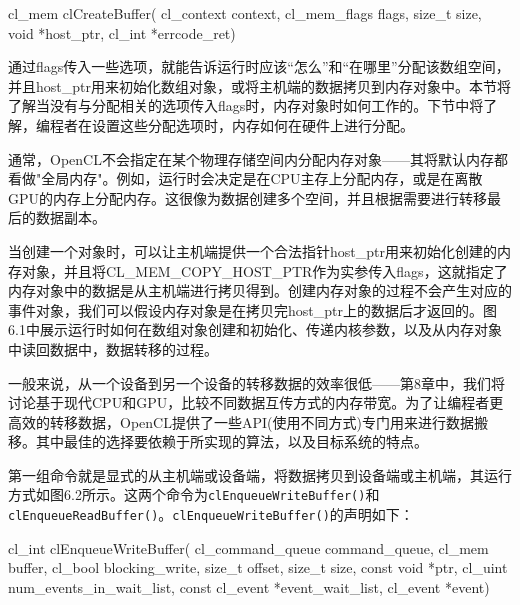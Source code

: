 \begin{codebox}[cpp]
cl_mem
clCreateBuffer(
  cl_context context,
  cl_mem_flags flags,
  size_t size,
  void *host_ptr,
  cl_int *errcode_ret)
\end{codebox}

通过flags传入一些选项，就能告诉运行时应该“怎么”和“在哪里”分配该数组空间，并且host\_\allowbreak{}ptr用来初始化数组对象，或将主机端的数据拷贝到内存对象中。本节将了解当没有与分配相关的选项传入flags时，内存对象时如何工作的。下节中将了解，编程者在设置这些分配选项时，内存如何在硬件上进行分配。

通常，OpenCL不会指定在某个物理存储空间内分配内存对象——其将默认内存都看做"全局内存"。例如，运行时会决定是在CPU主存上分配内存，或是在离散GPU的内存上分配内存。这很像为数据创建多个空间，并且根据需要进行转移最后的数据副本。

当创建一个对象时，可以让主机端提供一个合法指针host\_\allowbreak{}ptr用来初始化创建的内存对象，并且将CL\_\allowbreak{}MEM\_\allowbreak{}COPY\_\allowbreak{}HOST\_\allowbreak{}PTR作为实参传入flags，这就指定了内存对象中的数据是从主机端进行拷贝得到。创建内存对象的过程不会产生对应的事件对象，我们可以假设内存对象是在拷贝完host\_\allowbreak{}ptr上的数据后才返回的。图6.1中展示运行时如何在数组对象创建和初始化、传递内核参数，以及从内存对象中读回数据中，数据转移的过程。


一般来说，从一个设备到另一个设备的转移数据的效率很低——第8章中，我们将讨论基于现代CPU和GPU，比较不同数据互传方式的内存带宽。为了让编程者更高效的转移数据，OpenCL提供了一些API(使用不同方式)专门用来进行数据搬移。其中最佳的选择要依赖于所实现的算法，以及目标系统的特点。

第一组命令就是显式的从主机端或设备端，将数据拷贝到设备端或主机端，其运行方式如图6.2所示。这两个命令为\texttt{clEnqueueWriteBuffer()}和\texttt{clEnqueueReadBuffer()}。\texttt{clEnqueueWriteBuffer()}的声明如下：

\begin{codebox}[cpp]
cl_int
clEnqueueWriteBuffer(
  cl_command_queue command_queue,
  cl_mem buffer,
  cl_bool blocking_write,
  size_t offset,
  size_t size,
  const void *ptr,
  cl_uint num_events_in_wait_list,
  const cl_event *event_wait_list,
  cl_event *event)
\end{codebox}

